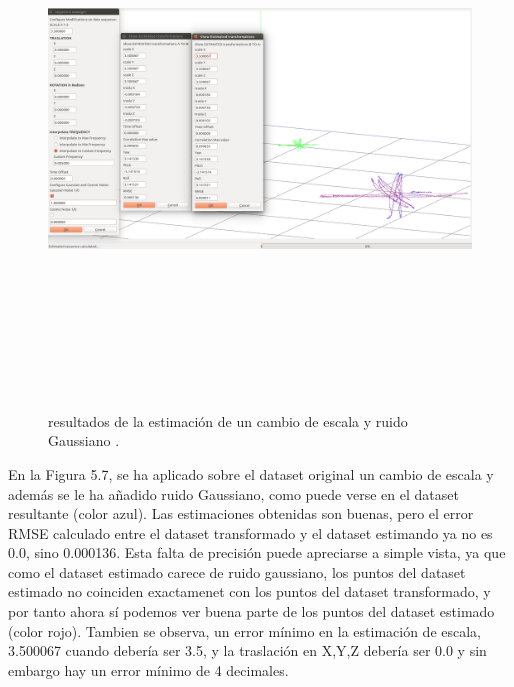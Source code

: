 \begin{figure}[H]
\begin{center}
\label{fig:opciones de View}\includegraphics[height=14.0cm,width=18.0cm]{img/cap6/Escala_GaussNoise_abba.png}
\hspace{0.5cm}

\end{center}

\caption{resultados de la estimación de un cambio de escala y ruido Gaussiano .}
\end{figure}

En la Figura 5.7, se ha aplicado sobre el dataset original un cambio de escala y además se le ha añadido ruido Gaussiano, como puede verse en el dataset resultante (color azul). Las estimaciones obtenidas son buenas, pero el error RMSE calculado entre el dataset transformado y el dataset estimando ya no es 0.0, sino 0.000136. Esta falta de precisión puede apreciarse a simple vista, ya que como el dataset estimado carece de ruido gaussiano, los puntos del dataset estimado no coinciden exactamenet con los puntos del dataset transformado, y por tanto ahora sí podemos ver buena parte de los puntos del dataset estimado (color rojo).
Tambien se observa, un error mínimo en la estimación de escala, 3.500067 cuando debería ser 3.5, y la traslación en X,Y,Z debería ser 0.0 y sin embargo hay un error mínimo de 4 decimales.

